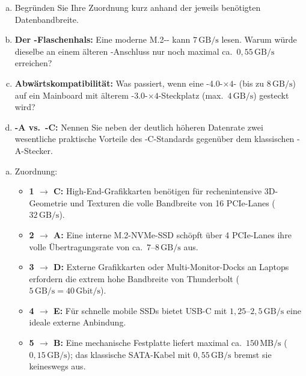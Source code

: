 \begin{myexercise}
    \begin{enumerate}[(a)]
        \item Begründen Sie Ihre Zuordnung kurz anhand der jeweils benötigten Datenbandbreite.
        \item \textbf{Der -Flaschenhals:} Eine moderne M.2-- kann $7\,\mathrm{GB/s}$ lesen. Warum würde dieselbe  an einem älteren -Anschluss nur noch maximal ca.\ $0{,}55\,\mathrm{GB/s}$ erreichen?
        \item \textbf{Abwärtskompatibilität:} Was passiert, wenn eine -4.0-$\times 4$- (bis zu $8\,\mathrm{GB/s}$) auf ein Mainboard mit älterem -3.0-$\times 4$-Steckplatz (max.\ $4\,\mathrm{GB/s}$) gesteckt wird?
        \item \textbf{-A vs.\ -C:} Nennen Sie neben der deutlich höheren Datenrate zwei wesentliche praktische Vorteile des -C-Standards gegenüber dem klassischen -A-Stecker.
    \end{enumerate}
    \begin{myanswer}
        \begin{enumerate}[(a)]
            \item Zuordnung:
            \begin{itemize}
                \item \textbf{1 $\to$ C:} High-End-Grafikkarten benötigen für rechenintensive 3D-Geometrie und Texturen die volle Bandbreite von 16 \gls{PCIe}-Lanes ($32\,\mathrm{GB/s}$).
                \item \textbf{2 $\to$ A:} Eine interne M.2-\gls{NVMe}-\gls{SSD} schöpft über 4 \gls{PCIe}-Lanes ihre volle Übertragungsrate von ca.\ $7\text{--}8\,\mathrm{GB/s}$ aus.
                \item \textbf{3 $\to$ D:} Externe Grafikkarten oder Multi-Monitor-Docks an Laptops erfordern die extrem hohe Bandbreite von Thunderbolt ($5\,\mathrm{GB/s} = 40\,\mathrm{Gbit/s}$).
                \item \textbf{4 $\to$ E:} Für schnelle mobile \glspl{SSD} bietet \gls{USB}-C mit $1{,}25\text{--}2{,}5\,\mathrm{GB/s}$ eine ideale externe Anbindung.
                \item \textbf{5 $\to$ B:} Eine mechanische Festplatte liefert maximal ca.\ $150\,\mathrm{MB/s}$ ($0{,}15\,\mathrm{GB/s}$); das klassische \gls{SATA}-Kabel mit $0{,}55\,\mathrm{GB/s}$ bremst sie keineswegs aus.

\end{itemize}
\end{enumerate}
\end{myanswer}
\end{myexercise}
